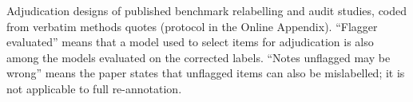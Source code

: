 \begin{table}[t]
\centering
\scriptsize

\caption{Adjudication designs of published benchmark relabelling and audit studies, coded from verbatim methods quotes (protocol in the Online Appendix). ``Flagger evaluated'' means that a model used to select items for adjudication is also among the models evaluated on the corrected labels. ``Notes unflagged may be wrong'' means the paper states that unflagged items can also be mislabelled; it is not applicable to full re-annotation.}
\label{tab:literature}
\end{table}
